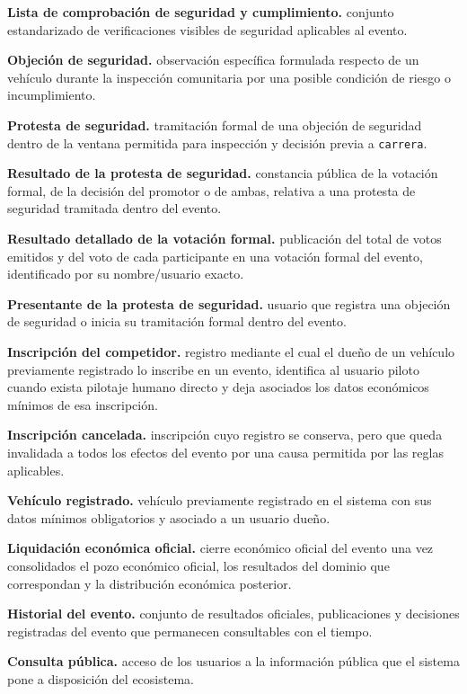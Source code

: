 \documentclass[10pt,letterpaper]{article}
\begin{document}
\noindent\textbf{Lista de comprobación de seguridad y cumplimiento.} conjunto estandarizado de verificaciones visibles de seguridad aplicables al evento.\par
\noindent\textbf{Objeción de seguridad.} observación específica formulada respecto de un vehículo durante la inspección comunitaria por una posible condición de riesgo o incumplimiento.\par
\noindent\textbf{Protesta de seguridad.} tramitación formal de una objeción de seguridad dentro de la ventana permitida para inspección y decisión previa a \texttt{carrera}.\par
\noindent\textbf{Resultado de la protesta de seguridad.} constancia pública de la votación formal, de la decisión del promotor o de ambas, relativa a una protesta de seguridad tramitada dentro del evento.\par
\noindent\textbf{Resultado detallado de la votación formal.} publicación del total de votos emitidos y del voto de cada participante en una votación formal del evento, identificado por su nombre/usuario exacto.\par
\noindent\textbf{Presentante de la protesta de seguridad.} usuario que registra una objeción de seguridad o inicia su tramitación formal dentro del evento.\par
\noindent\textbf{Inscripción del competidor.} registro mediante el cual el dueño de un vehículo previamente registrado lo inscribe en un evento, identifica al usuario piloto cuando exista pilotaje humano directo y deja asociados los datos económicos mínimos de esa inscripción.\par
\noindent\textbf{Inscripción cancelada.} inscripción cuyo registro se conserva, pero que queda invalidada a todos los efectos del evento por una causa permitida por las reglas aplicables.\par
\noindent\textbf{Vehículo registrado.} vehículo previamente registrado en el sistema con sus datos mínimos obligatorios y asociado a un usuario dueño.\par
\noindent\textbf{Liquidación económica oficial.} cierre económico oficial del evento una vez consolidados el pozo económico oficial, los resultados del dominio que correspondan y la distribución económica posterior.\par
\noindent\textbf{Historial del evento.} conjunto de resultados oficiales, publicaciones y decisiones registradas del evento que permanecen consultables con el tiempo.\par
\noindent\textbf{Consulta pública.} acceso de los usuarios a la información pública que el sistema pone a disposición del ecosistema.\par
\end{document}
